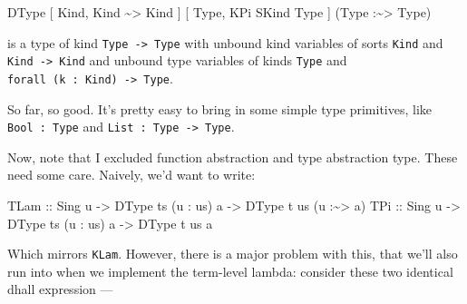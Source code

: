 \documentclass[]{article}
\newenvironment{Shaded}{}{}
\newcommand{\DataTypeTok}[1]{\textcolor[rgb]{0.56,0.13,0.00}{#1}}
\newcommand{\NormalTok}[1]{#1}
\newcommand{\OperatorTok}[1]{\textcolor[rgb]{0.40,0.40,0.40}{#1}}
\newcommand{\OtherTok}[1]{\textcolor[rgb]{0.00,0.44,0.13}{#1}}
\begin{document}
\begin{Shaded}
\begin{Highlighting}[]
\DataTypeTok{DType}\NormalTok{ \textquotesingle{}[ }\DataTypeTok{\textquotesingle{}Kind}\NormalTok{, }\DataTypeTok{\textquotesingle{}Kind} \OperatorTok{\textasciitilde{}\textgreater{}} \DataTypeTok{\textquotesingle{}Kind}\NormalTok{    ]}
\NormalTok{      \textquotesingle{}[ }\DataTypeTok{\textquotesingle{}Type}\NormalTok{, }\DataTypeTok{\textquotesingle{}KPi} \DataTypeTok{\textquotesingle{}SKind} \DataTypeTok{\textquotesingle{}Type}\NormalTok{ ]}
\NormalTok{      (}\DataTypeTok{\textquotesingle{}Type}\NormalTok{ \textquotesingle{}}\OperatorTok{:\textasciitilde{}\textgreater{}} \DataTypeTok{\textquotesingle{}Type}\NormalTok{)}
\end{Highlighting}
\end{Shaded}

is a type of kind \texttt{Type\ -\textgreater{}\ Type} with unbound kind
variables of sorts \texttt{Kind} and \texttt{Kind\ -\textgreater{}\ Kind} and
unbound type variables of kinds \texttt{Type} and
\texttt{forall\ (k\ :\ Kind)\ -\textgreater{}\ Type}.

So far, so good. It's pretty easy to bring in some simple type primitives, like
\texttt{Bool\ :\ Type} and \texttt{List\ :\ Type\ -\textgreater{}\ Type}.

Now, note that I excluded function abstraction and type abstraction type. These
need some care. Naively, we'd want to write:

\begin{Shaded}
\begin{Highlighting}[]
\DataTypeTok{TLam}\OtherTok{ ::} \DataTypeTok{Sing}\NormalTok{ u }\OtherTok{{-}\textgreater{}} \DataTypeTok{DType}\NormalTok{ ts (u \textquotesingle{}}\OperatorTok{:}\NormalTok{ us) a }\OtherTok{{-}\textgreater{}} \DataTypeTok{DType}\NormalTok{ t us (u \textquotesingle{}}\OperatorTok{:\textasciitilde{}\textgreater{}}\NormalTok{ a)}
\DataTypeTok{TPi}\OtherTok{  ::} \DataTypeTok{Sing}\NormalTok{ u }\OtherTok{{-}\textgreater{}} \DataTypeTok{DType}\NormalTok{ ts (u \textquotesingle{}}\OperatorTok{:}\NormalTok{ us) a }\OtherTok{{-}\textgreater{}} \DataTypeTok{DType}\NormalTok{ t us a}
\end{Highlighting}
\end{Shaded}

Which mirrors \texttt{KLam}. However, there is a major problem with this, that
we'll also run into when we implement the term-level lambda: consider these two
identical dhall expression ---
\end{document}
